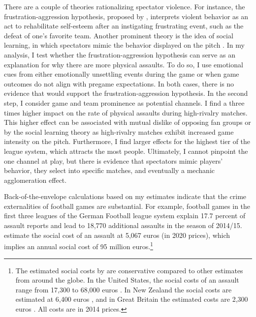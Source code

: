 There are a couple of theories rationalizing spectator violence. For instance, the frustration-aggression hypothesis, proposed by \cite{dollard1939frustration}, interprets violent behavior as an act to rehabilitate self-esteem after an instigating frustrating event, such as the defeat of one's favorite team. Another prominent theory is the idea of social learning, in which spectators mimic the behavior displayed on the pitch \citep{bandura1973aggression, bandura2007social}. In my analysis, I test whether the frustration-aggression hypothesis can serve as an explanation for why there are more physical assaults. To do so, I use emotional cues from either emotionally unsettling events during the game or when game outcomes do not align with pregame expectations. In both cases, there is no evidence that would support the frustration-aggression hypothesis. In the second step, I consider game and team prominence as potential channels. I find a three times higher impact on the rate of physical assaults during high-rivalry matches. This higher effect can be associated with mutual dislike of opposing fan groups or by the social learning theory as high-rivalry matches exhibit increased game intensity on the pitch. Furthermore, I find larger effects for the highest tier of the league system, which attracts the most people. Ultimately, I cannot pinpoint the one channel at play, but there is evidence that spectators mimic players' behavior, they select into specific matches, and eventually a mechanic agglomeration effect. 



Back-of-the-envelope calculations based on my estimates indicate that the crime externalities of football games are substantial. For example, football games in the first three leagues of the German Football league system explain 17.7 percent of assault reports and lead to 18,770 additional assaults in the season of 2014/15. \cite{glaubitz2016kostet} estimate the social cost of an assault at 5,067 euros (in 2020 prices), which implies an annual social cost of 95 million euros.\footnote{The estimated social costs by \cite{glaubitz2016kostet} are conservative compared to other estimates from around the globe. In the United States, the social costs of an assault range from 17,300 to 68,000 euros \citep{miller1996victim,cohen2004willingness}. In New Zealand the social costs are estimated at 6,400 euros \citep{roper2006estimating}, and in Great Britain the estimated costs are 2,300 euros \citep{dubourg2005economic}. All costs are in 2014 prices.}




